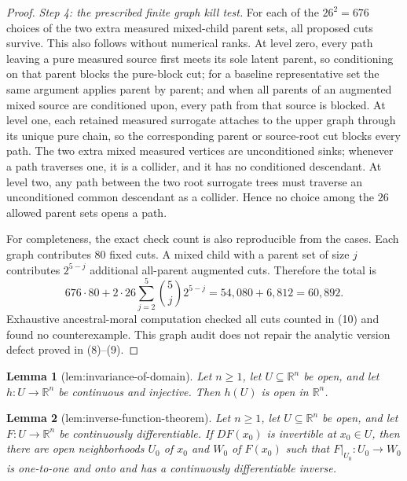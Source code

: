 \documentclass{article}
\newtheorem{lemma}{Lemma}
\begin{document}
\begin{proof}
\emph{Step 4: the prescribed finite graph kill test.}
For each of the \(26^2=676\) choices of the two extra measured mixed-child parent sets, all proposed cuts survive.  This also follows without numerical ranks.  At level zero, every path leaving a pure measured source first meets its sole latent parent, so conditioning on that parent blocks the pure-block cut; for a baseline representative set the same argument applies parent by parent; and when all parents of an augmented mixed source are conditioned upon, every path from that source is blocked.  At level one, each retained measured surrogate attaches to the upper graph through its unique pure chain, so the corresponding parent or source-root cut blocks every path.  The two extra mixed measured vertices are unconditioned sinks; whenever a path traverses one, it is a collider, and it has no conditioned descendant.  At level two, any path between the two root surrogate trees must traverse an unconditioned common descendant as a collider.  Hence no choice among the \(26\) allowed parent sets opens a path.

For completeness, the exact check count is also reproducible from the cases.  Each graph contributes \(80\) fixed cuts.  A mixed child with a parent set of size \(j\) contributes \(2^{5-j}\) additional all-parent augmented cuts.  Therefore the total is
\[
 676\cdot80
 +2\cdot26\sum_{j=2}^{5}\binom{5}{j}2^{5-j}
 =54{,}080+6{,}812
 =60{,}892. \tag{10}
\]
Exhaustive ancestral-moral computation checked all cuts counted in (10) and found no counterexample.  This graph audit does not repair the analytic version defect proved in (8)--(9).
\end{proof}

\begin{lemma}[lem:invariance-of-domain]\label{lem:invariance-of-domain}
Let \(n\geq1\), let \(U\subseteq\mathbb R^n\) be open, and let \(h:U\to\mathbb R^n\) be continuous and injective. Then \(h(U)\) is open in \(\mathbb R^n\).
\end{lemma}

\begin{lemma}[lem:inverse-function-theorem]\label{lem:inverse-function-theorem}
Let \(n\geq 1\), let \(U\subseteq\mathbb R^n\) be open, and let \(F:U\to\mathbb R^n\) be continuously differentiable.  If \(DF(x_0)\) is invertible at \(x_0\in U\), then there are open neighborhoods \(U_0\) of \(x_0\) and \(W_0\) of \(F(x_0)\) such that \(F|_{U_0}:U_0\to W_0\) is one-to-one and onto and has a continuously differentiable inverse.
\end{lemma}
\end{document}
